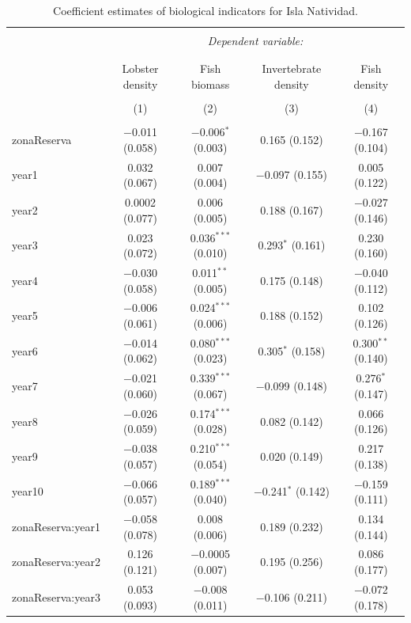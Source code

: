\documentclass[10pt]{article}
\begin{document}
\begin{table}[h] \centering 
  \caption{Coefficient estimates of biological indicators for Isla Natividad.} 
  \label{} 
\small 
\begin{tabular}{@{\extracolsep{1pt}}lcccc} 
\\[-1.8ex]\hline 
\hline \\[-1.8ex] 
 & \multicolumn{4}{c}{\textit{Dependent variable:}} \\ 
\cline{2-5} 
\\[-1.8ex] & \multicolumn{4}{c}{} \\ 
 & Lobster density & Fish biomass & Invertebrate density & Fish density \\ 
\\[-1.8ex] & (1) & (2) & (3) & (4)\\ 
\hline \\[-1.8ex] 
 zonaReserva & $-$0.011 (0.058) & $-$0.006$^{*}$ (0.003) & 0.165 (0.152) & $-$0.167 (0.104) \\ 
  year1 & 0.032 (0.067) & 0.007 (0.004) & $-$0.097 (0.155) & 0.005 (0.122) \\ 
  year2 & 0.0002 (0.077) & 0.006 (0.005) & 0.188 (0.167) & $-$0.027 (0.146) \\ 
  year3 & 0.023 (0.072) & 0.036$^{***}$ (0.010) & 0.293$^{*}$ (0.161) & 0.230 (0.160) \\ 
  year4 & $-$0.030 (0.058) & 0.011$^{**}$ (0.005) & 0.175 (0.148) & $-$0.040 (0.112) \\ 
  year5 & $-$0.006 (0.061) & 0.024$^{***}$ (0.006) & 0.188 (0.152) & 0.102 (0.126) \\ 
  year6 & $-$0.014 (0.062) & 0.080$^{***}$ (0.023) & 0.305$^{*}$ (0.158) & 0.300$^{**}$ (0.140) \\ 
  year7 & $-$0.021 (0.060) & 0.339$^{***}$ (0.067) & $-$0.099 (0.148) & 0.276$^{*}$ (0.147) \\ 
  year8 & $-$0.026 (0.059) & 0.174$^{***}$ (0.028) & 0.082 (0.142) & 0.066 (0.126) \\ 
  year9 & $-$0.038 (0.057) & 0.210$^{***}$ (0.054) & 0.020 (0.149) & 0.217 (0.138) \\ 
  year10 & $-$0.066 (0.057) & 0.189$^{***}$ (0.040) & $-$0.241$^{*}$ (0.142) & $-$0.159 (0.111) \\ 
  zonaReserva:year1 & $-$0.058 (0.078) & 0.008 (0.006) & 0.189 (0.232) & 0.134 (0.144) \\ 
  zonaReserva:year2 & 0.126 (0.121) & $-$0.0005 (0.007) & 0.195 (0.256) & 0.086 (0.177) \\ 
  zonaReserva:year3 & 0.053 (0.093) & $-$0.008 (0.011) & $-$0.106 (0.211) & $-$0.072 (0.178) \\ 

\end{tabular}
\end{table}
\end{document}

